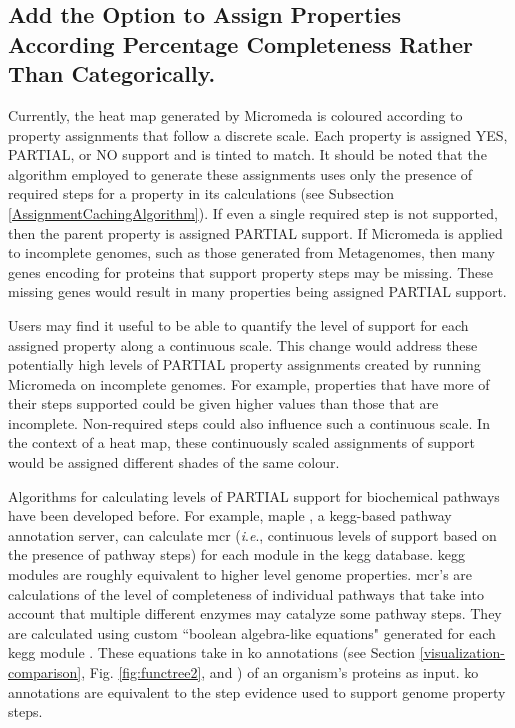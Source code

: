 \subsection{Add the Option to Assign Properties According Percentage 
Completeness Rather Than Categorically.}

Currently, the heat map generated by Micromeda is coloured according to property 
assignments that follow a discrete scale. Each property is assigned YES, 
PARTIAL, or NO support and is tinted to match. It should be noted that the 
algorithm employed to generate these assignments uses only the presence of 
required steps for a property in its calculations (see Subsection 
\ref{AssignmentCachingAlgorithm}). If even a single required step is not 
supported, then the parent property is assigned PARTIAL support. If Micromeda is 
applied to incomplete genomes, such as those generated from Metagenomes, then 
many genes encoding for proteins that support property steps may be missing. 
These missing genes would result in many properties being assigned PARTIAL 
support. 

Users may find it useful to be able to quantify the level of support for each 
assigned property along a continuous scale. This change would address these 
potentially high levels of PARTIAL property assignments created by running 
Micromeda on incomplete genomes. For example, properties that have more of their 
steps supported could be given higher values than those that are incomplete. 
Non-required steps could also influence such a continuous scale. In the context 
of a heat map, these continuously scaled assignments of support would be 
assigned different shades of the same colour.

Algorithms for calculating levels of PARTIAL support for biochemical pathways 
have been developed before. For example, \gls{maple} \cite{takami2016automated}, 
a \gls{kegg}-based pathway annotation server, can calculate \gls{mcr} (\textit{i}.\textit{e}., 
continuous levels of support based on the presence of pathway steps) for each 
module in the \gls{kegg}  database. \gls{kegg} modules are roughly equivalent to 
higher level genome properties. \gls{mcr}'s are calculations of the level of 
completeness of individual pathways that take into account that multiple 
different enzymes may catalyze some pathway steps. They are calculated using 
custom ``boolean algebra-like equations" generated for each \gls{kegg} module 
\cite{takami2012evaluation}. These equations take in \gls{ko} annotations (see 
Section \ref{visualization-comparison}, Fig. \ref{fig:functree2}, and 
\cite{mao2005automated}) of an organism's proteins as input. \gls{ko} 
annotations are equivalent to the step evidence used to support genome property 
steps. 

